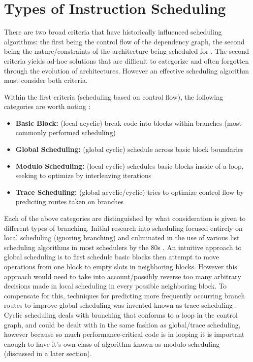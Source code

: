 \documentclass[12pt]{report}
\begin{document}
\section{Types of Instruction Scheduling}
\label{sec:orgb2a0246}
There are two broad criteria that have historically influenced scheduling
algorithms: the first being the control flow of the dependency graph, the
second being the nature/constraints of the architecture being scheduled for
\parencite{rau1993instruction}. The second criteria yields ad-hoc solutions
that are difficult to categorize and often forgotten through the evolution of
architectures. However an effective scheduling algorithm must consider both criteria.

Within the first criteria (scheduling based on control flow), the following
categories are worth noting \parencite{rau1993instruction}:
\begin{itemize}
\item \textbf{Basic Block:} (local acyclic) break code into blocks within branches (most commonly performed scheduling)
\item \textbf{Global Scheduling:} (global cyclic) schedule across basic block boundaries
\item \textbf{Modulo Scheduling:} (local cyclic) schedules basic blocks inside of a loop, seeking to
optimize by interleaving iterations
\item \textbf{Trace Scheduling:} (global acyclic/cyclic) tries to optimize control flow by predicting routes
taken on branches
\end{itemize}
Each of the above categories are distinguished by what consideration is given
to different types of branching. Initial research into scheduling focused
entirely on local scheduling (ignoring branching)
\parencite{rau1993instruction} and culminated in the use of various list
scheduling algorithms in most schedulers by the 80s
\parencite{fisher1983very}. An intuitive approach to global scheduling is to
first schedule basic blocks then attempt to move operations from one block to
empty slots in neighboring blocks. However this approach would need to take
into account/possibly reverse too many arbitrary decisions made in local
scheduling in every possible neighboring block. To compensate for this,
techniques for predicting more frequently occurring branch routes to improve
global scheduling was invented known as trace scheduling
\parencite{fisher1981trace}. Cyclic scheduling deals with branching that
conforms to a loop in the control graph, and could be dealt with in the same
fashion as global/trace scheduling, however because so much
performance-critical code is in looping it is important enough to
have it's own class of algorithm known as modulo scheduling (discussed in a
later section).
\end{document}
